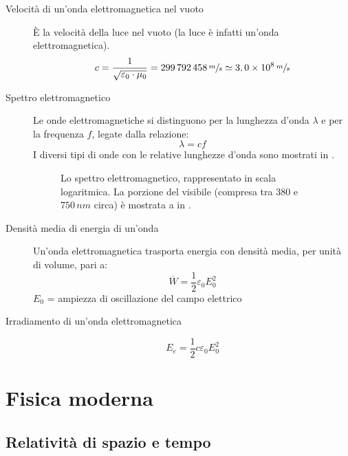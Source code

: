 \documentclass[a4paper,11pt,italian]{article}
\begin{document}
\begin{description}
  \item[Velocità di un'onda elettromagnetica nel vuoto] 
  È la velocità della luce nel vuoto (la luce è infatti un'onda elettromagnetica).
  \[ c = \frac{1}{\sqrt{\varepsilon_0\cdot \mu_0}} =299\,  792\, 458\,	\sfrac{m}{s} \simeq 3,0 \times 10^8 \,	\sfrac{m}{s} \]
  
  \item[Spettro elettromagnetico] 
  Le onde elettromagnetiche si distinguono per la lunghezza d'onda $ \lambda $ e per la frequenza $ f $, legate dalla relazione:
  \[ \lambda = c f \]
  I diversi tipi di onde con le relative lunghezze d'onda sono mostrati in .

\begin{figure}[htp]\centering
\begin{tikzpicture}[fill between/on layer={axis grid}]

\end{tikzpicture}
\caption{Lo spettro elettromagnetico, rappresentato in scala logaritmica. La porzione del visibile (compresa tra $ 380 $ e $ 750 \, nm $ circa) è mostrata a  in .}
\label{img:spettroelettromagnetico}
\end{figure}
  
  \item[Densità media di energia di un'onda] 
  Un'onda elettromagnetica trasporta energia con densità media, per unità di volume, pari a: 
  \[ \overline{W} = \frac{1}{2} \varepsilon_0 E_0^2 \]
  $ E_0 $ = ampiezza di oscillazione del campo elettrico
  
  \item[Irradiamento di un'onda elettromagnetica]
  \[ E_e = \frac{1}{2} c \varepsilon_0 E_0^2 \]
\end{description}


\newpage
\section{Fisica moderna}

\subsection{Relatività di spazio e tempo}
\end{document}
